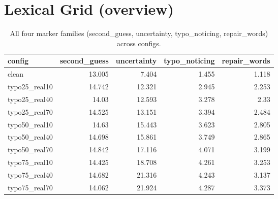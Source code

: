 \documentclass[11pt]{article}
\begin{document}
\section*{Lexical Grid (overview)}
\begin{table}[H]
\centering
\caption{All four marker families (second\_guess, uncertainty, typo\_noticing, repair\_words) across configs.}
\small
\begin{adjustbox}{max width=\textwidth}
\begin{tabular}{lrrrr}
\toprule
\textbf{config} & \textbf{second\_guess} & \textbf{uncertainty} & \textbf{typo\_noticing} & \textbf{repair\_words} \\
\midrule
clean & 13.005 & 7.404 & 1.455 & 1.118 \\
typo25\_real10 & 14.742 & 12.321 & 2.945 & 2.253 \\
typo25\_real40 & 14.03 & 12.593 & 3.278 & 2.33 \\
typo25\_real70 & 14.525 & 13.151 & 3.394 & 2.484 \\
typo50\_real10 & 14.63 & 15.443 & 3.623 & 2.805 \\
typo50\_real40 & 14.698 & 15.861 & 3.749 & 2.865 \\
typo50\_real70 & 14.842 & 17.116 & 4.071 & 3.199 \\
typo75\_real10 & 14.425 & 18.708 & 4.261 & 3.253 \\
typo75\_real40 & 14.682 & 21.316 & 4.243 & 3.137 \\
typo75\_real70 & 14.062 & 21.924 & 4.287 & 3.373 \\
\bottomrule
\end{tabular}
\end{adjustbox}
\end{table}
\end{document}
